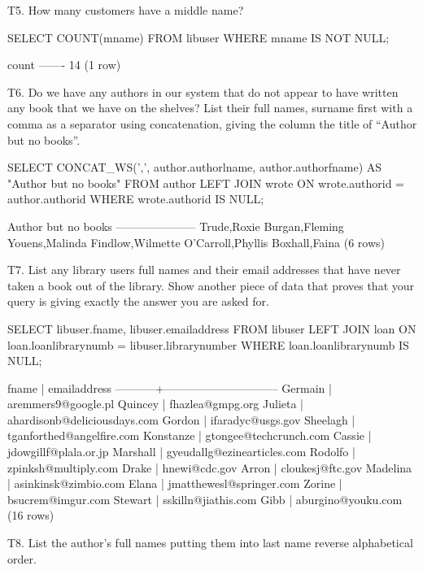 T5. How many customers have a middle name?
\begin{sql}
SELECT COUNT(mname) FROM libuser
WHERE mname IS NOT NULL;
\end{sql}
\begin{pseudo}
 count
-------
    14
(1 row)
\end{pseudo}

T6. Do we have any authors in our system that do not appear to have written any book that we have on the shelves? List their full names, surname first with a comma as a separator using concatenation, giving the column the title of ``Author but no books''.
\begin{sql}
SELECT CONCAT_WS(',', author.authorlname, author.authorfname) AS "Author but no books" FROM author
LEFT JOIN wrote ON wrote.authorid = author.authorid
WHERE wrote.authorid IS NULL;
\end{sql}

\begin{pseudo}
 Author but no books
---------------------
 Trude,Roxie
 Burgan,Fleming
 Youens,Malinda
 Findlow,Wilmette
 O'Carroll,Phyllis
 Boxhall,Faina
(6 rows)
\end{pseudo}

T7. List any library users full names and their email addresses that have never taken a book out of the library. Show another piece of data that proves that your query is giving exactly the answer you are asked for.
\begin{sql}
SELECT libuser.fname, libuser.emailaddress FROM libuser
LEFT JOIN loan ON loan.loanlibrarynumb = libuser.librarynumber
WHERE loan.loanlibrarynumb IS NULL;
\end{sql}

\begin{pseudo}
   fname   |         emailaddress
-----------+------------------------------
 Germain   | aremmers9@google.pl
 Quincey   | fhazlea@gmpg.org
 Julieta   | ahardisonb@deliciousdays.com
 Gordon    | ifaradyc@usgs.gov
 Sheelagh  | tganforthed@angelfire.com
 Konstanze | gtongee@techcrunch.com
 Cassie    | jdowgillf@plala.or.jp
 Marshall  | gyeudallg@ezinearticles.com
 Rodolfo   | zpinksh@multiply.com
 Drake     | hnewi@cdc.gov
 Arron     | cloukesj@ftc.gov
 Madelina  | asinkinsk@zimbio.com
 Elana     | jmatthewesl@springer.com
 Zorine    | bsucrem@imgur.com
 Stewart   | sskilln@jiathis.com
 Gibb      | aburgino@youku.com
(16 rows)
\end{pseudo}

T8. List the author's full names putting them into last name reverse alphabetical order.

